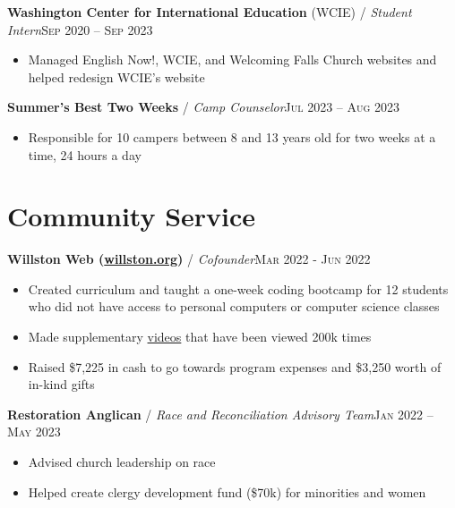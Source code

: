 \documentclass[12pt, a4paper]{article}
\begin{document}
\textbf{Washington Center for International Education} (WCIE) / \textit{Student Intern}\hfill\textsc{Sep 2020 -- Sep 2023}\\
\begin{itemize}
    \vspace{-8mm}
    \item Managed English Now!, WCIE, and Welcoming Falls Church websites and helped redesign WCIE's website
\end{itemize}

\textbf{Summer's Best Two Weeks} / \textit{Camp Counselor}\hfill\textsc{Jul 2023 -- Aug 2023}\\
\begin{itemize}
    \vspace{-8mm}
    \item Responsible for 10 campers between 8 and 13 years old for two weeks at a time, 24 hours a day
\end{itemize}

\vspace{-8mm}
\section*{Community Service}
\vspace{-2mm}

\textbf{Willston Web (\href{https://willston.org}{willston.org})} / \textit{Cofounder}\hfill\textsc{Mar 2022 - Jun 2022}\\
\begin{itemize}
    \vspace{-8mm}
    \item Created curriculum and taught a one-week coding bootcamp for 12 students who did not have access to personal computers or computer science classes
    \item Made supplementary \href{https://youtube.com/JonathanBuchh}{videos} that have been viewed 200k times
    \item Raised \$7,225 in cash to go towards program expenses and \$3,250 worth of in-kind gifts
\end{itemize}

\textbf{Restoration Anglican} / \textit{Race and Reconciliation Advisory Team}\hfill\textsc{Jan 2022 -- May 2023}\\
\begin{itemize}
    \vspace{-8mm}
    \item Advised church leadership on race
    \item Helped create clergy development fund (\$70k) for minorities and women
\end{itemize}
\end{document}
